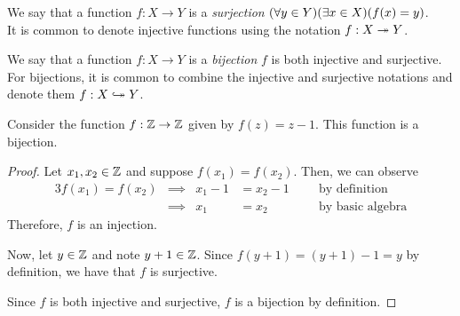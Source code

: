 \begin{definition}[Surjectivity]
    We say that a function $f: X \to Y$ is a \emph{surjection}
    \iffbydefn $\pn*{\forall y \in Y}\pn*{\exists x \in X}\pn*{f(x) = y}$.\\
    It is common to denote injective functions using the notation $f: X \twoheadrightarrow Y$.
\end{definition}

\begin{definition}[Bijectivity]
    We say that a function $f: X \to Y$ is a \emph{bijection}
    \iffbydefn $f$ is both injective and surjective.\\
    For bijections,
    it is common to combine the injective and surjective notations and denote them $f: X \bijection Y$.
\end{definition}

\begin{example}
    Consider the function $f: \mathbb{Z} \to \mathbb{Z}$ given by $f(z) = z - 1$.
    This function is a bijection.
\end{example}
\begin{proof}
    Let $x_1, x_2 \in \mathbb{Z}$ and suppose $f(x_1) = f(x_2)$.
    Then, we can observe
    \begin{alignat*}{3}
        f(x_1) = f(x_2) &\implies & x_1 - 1 &= x_2 - 1 &~~&\text{ by definition}\\
                        &\implies & x_1 &= x_2 &&\text{ by basic algebra}
    \end{alignat*}
    Therefore, $f$ is an injection.

    Now, let $y \in \mathbb{Z}$ and note $y + 1 \in \mathbb{Z}$.
    Since $f(y + 1) = (y + 1) - 1 = y$ by definition, we have that $f$ is surjective.

    Since $f$ is both injective and surjective, $f$ is a bijection by definition.
\end{proof}

